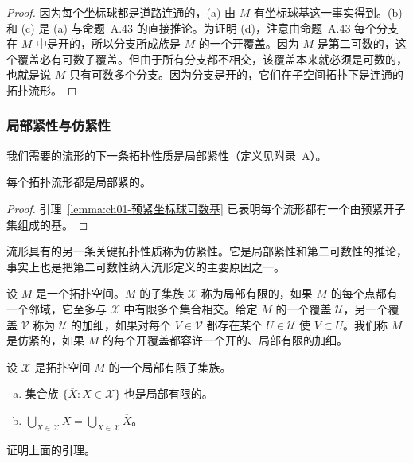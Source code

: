 \documentclass[../../main.tex]{subfiles}
\begin{document}
\begin{proof}
因为每个坐标球都是道路连通的，(a) 由 $M$ 有坐标球基这一事实得到。(b) 和 (c) 是 (a) 与命题~A.43 的直接推论。为证明 (d)，注意由命题~A.43 每个分支在 $M$ 中是开的，所以分支所成族是 $M$ 的一个开覆盖。因为 $M$ 是第二可数的，这个覆盖必有可数子覆盖。但由于所有分支都不相交，该覆盖本来就必须是可数的，也就是说 $M$ 只有可数多个分支。因为分支是开的，它们在子空间拓扑下是连通的拓扑流形。
\end{proof}

\subsubsection{局部紧性与仿紧性}\label{subsubsection:ch01-局部紧性与仿紧性}

我们需要的流形的下一条拓扑性质是局部紧性（定义见附录~A）。

\begin{proposition}[流形是局部紧的]\label{proposition:ch01-流形局部紧}
每个拓扑流形都是局部紧的。
\end{proposition}

\begin{proof}
引理~\cref{lemma:ch01-预紧坐标球可数基} 已表明每个流形都有一个由预紧开子集组成的基。
\end{proof}

流形具有的另一条关键拓扑性质称为仿紧性。它是局部紧性和第二可数性的推论，事实上也是把第二可数性纳入流形定义的主要原因之一。

设 $M$ 是一个拓扑空间。$M$ 的子集族 $\mathcal{X}$ 称为局部有限的，如果 $M$ 的每个点都有一个邻域，它至多与 $\mathcal{X}$ 中有限多个集合相交。给定 $M$ 的一个覆盖 $\mathcal{U}$，另一个覆盖 $\mathcal{V}$ 称为 $\mathcal{U}$ 的加细，如果对每个 $V\in\mathcal{V}$ 都存在某个 $U\in\mathcal{U}$ 使 $V\subset U$。我们称 $M$ 是仿紧的，如果 $M$ 的每个开覆盖都容许一个开的、局部有限的加细。

\begin{lemma}\label{lemma:ch01-局部有限集族}
设 $\mathcal{X}$ 是拓扑空间 $M$ 的一个局部有限子集族。
\begin{enumerate}[(a)]
\item 集合族 $\{\overline{X}:X\in\mathcal{X}\}$ 也是局部有限的。
\item $\bigcup_{X\in\mathcal{X}}X=\bigcup_{X\in\mathcal{X}}\overline{X}$。
\end{enumerate}
\end{lemma}

\begin{exercise}\label{exercise:ch01-1.14}
证明上面的引理。
\end{exercise}
\end{document}
